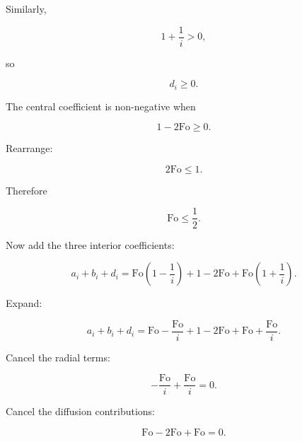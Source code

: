 \documentclass[11pt,a4paper]{article}
\begin{document}
Similarly,

\begin{equation}
1+\frac1i>0,
\tag{TRISO-DIS-508}
\label{eq:triso-dis-508}
\end{equation}

so

\begin{equation}
d_i\ge0.
\tag{TRISO-DIS-509}
\label{eq:triso-dis-509}
\end{equation}

The central coefficient is non-negative when

\begin{equation}
1-2\mathrm{Fo}\ge0.
\tag{TRISO-DIS-510}
\label{eq:triso-dis-510}
\end{equation}

Rearrange:

\begin{equation}
2\mathrm{Fo}\le1.
\tag{TRISO-DIS-511}
\label{eq:triso-dis-511}
\end{equation}

Therefore

\begin{equation}
\boxed{
\mathrm{Fo}\le\frac12.
}
\tag{TRISO-DIS-512}
\label{eq:triso-dis-512}
\end{equation}

Now add the three interior coefficients:

\begin{equation}
a_i+b_i+d_i
=
\mathrm{Fo}\left(1-\frac1i\right)
+
1-2\mathrm{Fo}
+
\mathrm{Fo}\left(1+\frac1i\right).
\tag{TRISO-DIS-513}
\label{eq:triso-dis-513}
\end{equation}

Expand:

\begin{equation}
a_i+b_i+d_i
=
\mathrm{Fo}
-\frac{\mathrm{Fo}}i
+
1
-
2\mathrm{Fo}
+
\mathrm{Fo}
+
\frac{\mathrm{Fo}}i.
\tag{TRISO-DIS-514}
\label{eq:triso-dis-514}
\end{equation}

Cancel the radial terms:

\begin{equation}
-\frac{\mathrm{Fo}}i
+
\frac{\mathrm{Fo}}i
=
0.
\tag{TRISO-DIS-515}
\label{eq:triso-dis-515}
\end{equation}

Cancel the diffusion contributions:

\begin{equation}
\mathrm{Fo}-2\mathrm{Fo}+\mathrm{Fo}=0.
\tag{TRISO-DIS-516}
\label{eq:triso-dis-516}
\end{equation}
\end{document}
